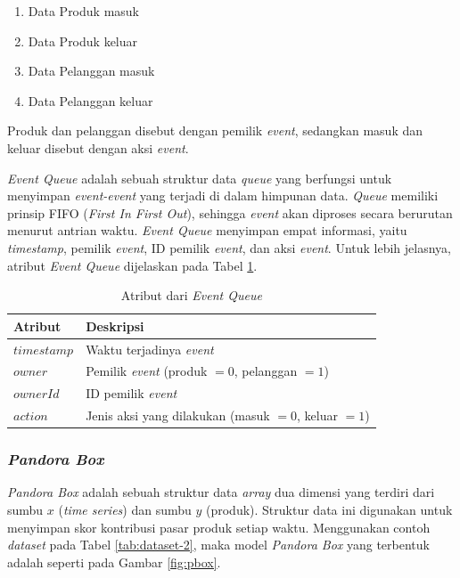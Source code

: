 \begin{enumerate}
	\item Data Produk masuk
	\item Data Produk keluar
	\item Data Pelanggan masuk
	\item Data Pelanggan keluar
\end{enumerate}
Produk dan pelanggan disebut dengan pemilik \textit{event}, sedangkan masuk dan keluar disebut dengan aksi \textit{event}.

\textit{Event Queue} adalah sebuah struktur data \textit{queue} yang berfungsi untuk menyimpan \textit{event-event} yang terjadi di dalam himpunan data. \textit{Queue} memiliki prinsip FIFO (\textit{First In First Out}), sehingga \textit{event} akan diproses secara berurutan menurut antrian waktu. \textit{Event Queue} menyimpan empat informasi, yaitu \textit{timestamp}, pemilik \textit{event}, ID pemilik \textit{event}, dan aksi \textit{event}. Untuk lebih jelasnya, atribut \textit{Event Queue} dijelaskan pada Tabel \ref{tab:attr-event-queue}.


\begin{table}[H]
	\centering
	\begin{tabular}{|p{2cm}|p{6cm}|}
		\hline
		\textbf{Atribut} & \textbf{Deskripsi} \\ \hline \hline
		$timestamp$ & Waktu terjadinya \textit{event} \\ \hline
		$owner$ & Pemilik \textit{event} (produk $= 0$, pelanggan $= 1$) \\ \hline
		$ownerId$ & ID pemilik \textit{event}\\ \hline
		$action$ & Jenis aksi yang dilakukan (masuk $= 0$, keluar $= 1$) \\ \hline
	\end{tabular} 
	\caption{Atribut dari \textit{Event Queue}}
	\label{tab:attr-event-queue}
\end{table}

\subsubsection{\textit{Pandora Box}}
\tab \textit{Pandora Box} adalah sebuah struktur data \textit{array} dua dimensi yang terdiri dari sumbu $x$ (\textit{time series}) dan sumbu $y$ (produk). Struktur data ini digunakan untuk menyimpan skor kontribusi pasar produk setiap waktu. Menggunakan contoh \textit{dataset} pada Tabel \ref{tab:dataset-2}, maka model \textit{Pandora Box} yang terbentuk adalah seperti pada Gambar \ref{fig:pbox}.  

